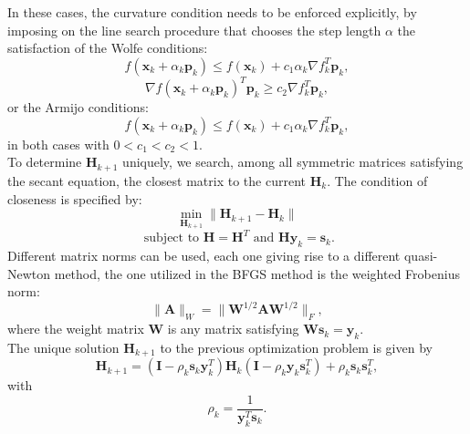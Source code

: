 \documentclass{article}
\numberwithin{equation}{section}
\begin{document}
In these cases, the curvature condition needs to be enforced explicitly, by imposing on the line search procedure that chooses the step length $\alpha$ the satisfaction of the Wolfe conditions:
\begin{equation*}
   f(\boldsymbol{x}_k + \alpha_k \boldsymbol{p}_k) \le f(\boldsymbol{x}_k) + c_1 \alpha_k \nabla f_k^T \boldsymbol{p}_k,
\end{equation*}
\begin{equation*}
    \nabla f(\boldsymbol{x}_k + \alpha_k \boldsymbol{p}_k)^T \boldsymbol{p}_k \ge c_2 \nabla f_k^T \boldsymbol{p}_k,
\end{equation*}
or the Armijo conditions:
\begin{equation*}
   f(\boldsymbol{x}_k + \alpha_k \boldsymbol{p}_k) \le f(\boldsymbol{x}_k) + c_1 \alpha_k \nabla f_k^T \boldsymbol{p}_k,
\end{equation*}
in both cases with $0 < c_1 < c_2 < 1$.
\\

To determine $\boldsymbol{H}_{k+1}$ uniquely, we search, among all symmetric matrices satisfying the secant equation, the closest matrix to the current $\boldsymbol{H}_k$. The condition of closeness is specified by:
\begin{equation*}
   \displaystyle \min_{\boldsymbol{H}_{k+1}} \| \boldsymbol{H}_{k+1} - \boldsymbol{H}_k\|
\end{equation*}
\begin{equation*}
    \text{   subject to   } \boldsymbol{H}=\boldsymbol{H}^T \text{  and  } \boldsymbol{H}\boldsymbol{y}_k = \boldsymbol{s}_k.
\end{equation*}
Different matrix norms can be used, each one giving rise to a different quasi-Newton method, the one utilized in the BFGS method is the weighted Frobenius norm:
\begin{equation*}
   \| \boldsymbol{A} \|_W=\| \boldsymbol{W}^{1/2} \boldsymbol{A} \boldsymbol{W}^{1/2}\|_F,
\end{equation*}
where the weight matrix $\boldsymbol{W}$ is any matrix satisfying $\boldsymbol{W} \boldsymbol{s}_k = \boldsymbol{y}_k$. 
\\

The unique solution $\boldsymbol{H}_{k+1}$ to the previous optimization problem is given by
\begin{equation}
    \boldsymbol{H}_{k+1} = (\boldsymbol{I} - \rho_k \boldsymbol{s}_k \boldsymbol{y}^T_k) \boldsymbol{H}_k (\boldsymbol{I} - \rho_k \boldsymbol{y}_k \boldsymbol{s}^T_k ) + \rho_k \boldsymbol{s}_k \boldsymbol{s}^T_k,
\end{equation} 
with 
\begin{equation*}
    \rho_k = \frac{1}{\boldsymbol{y}^T_k \boldsymbol{s}_k}.
\end{equation*}
\\
\end{document}

